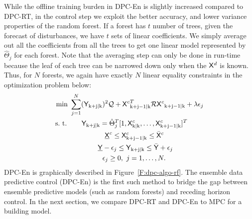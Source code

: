 While the offline training burden in DPC-En is slightly increased compared to DPC-RT, in the control step we exploit the better accuracy, and lower variance properties of the random forest. 
If a forest has $t$ number of trees, given the forecast of disturbances, we have $t$ sets of linear coefficients. We simply average out all the coefficients from all the trees to get one linear model represented by $\hat{\Theta}_j$ for each forest. Note that the averaging step can only be done in run-time because the leaf of each tree can be narrowed down only when the $\mathsf{X}^d$ is known. Thus, for $N$ forests, we again have exactly $N$ linear equality constraints in the optimization problem below:
\begin{align}
\begin{aligned}
\text{min } & \sum_{j=1}^{N} ({\mathsf{Y}}_{\mathrm{k+j|k}})^2 \mathcal{Q} + {\mathsf{X}^c}^T_{\mathrm{k+j-1|k}} \mathcal{R} {\mathsf{X}^c}_{\mathrm{k+j-1|k}} +  \lambda\epsilon_j\\
\text{s.~t. } & \ \ \ \ \ \mathsf{Y}_{\mathrm{k+j|k}} =  \hat{\Theta}^T_j [1,\mathsf{X}^c_{\mathrm{k|k}},\dots,\mathsf{X}^c_{\mathrm{k+j-1|k}} ]^T \\
& \ \ \ \ \ \ \ \ \ \ \ \ \ \ \ \underline{\mathsf{X}}^c \leq \mathsf{X}^c_{\mathrm{k+j-1|k}} \leq \bar{\mathsf{X}}^c\\ 
& \ \ \ \ \ \ \ \ \ \ \ \ \underline{\mathsf{Y}}-\epsilon_j \leq \mathsf{Y}_{\mathrm{k+j|k}} \leq \bar{\mathsf{Y}} + \epsilon_j\\\
& \ \ \ \ \ \ \ \ \ \ \ \ \ \ \epsilon_j \geq 0, \ j = 1,\dots,N.
\end{aligned}
\label{E:dpcrf}
\end{align}
DPC-En is graphically described in Figure~\ref{F:dpc-algo-rf}. The ensemble data predictive control (DPC-En) is the first such method to bridge the gap between ensemble predictive models (such as random forests) and receding horizon control. In the next section, we compare DPC-RT and DPC-En to MPC for a building model.